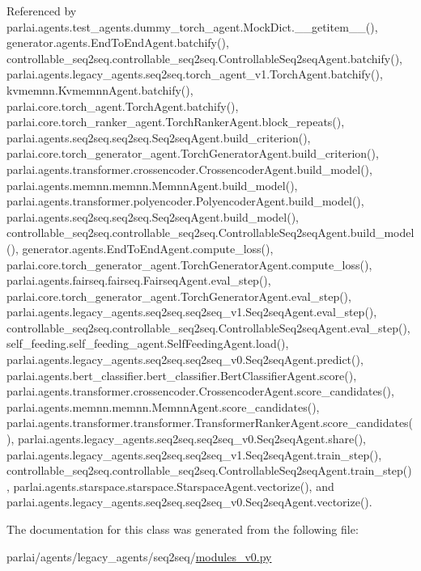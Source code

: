 Referenced by parlai.\+agents.\+test\+\_\+agents.\+dummy\+\_\+torch\+\_\+agent.\+Mock\+Dict.\+\_\+\+\_\+getitem\+\_\+\+\_\+(), generator.\+agents.\+End\+To\+End\+Agent.\+batchify(), controllable\+\_\+seq2seq.\+controllable\+\_\+seq2seq.\+Controllable\+Seq2seq\+Agent.\+batchify(), parlai.\+agents.\+legacy\+\_\+agents.\+seq2seq.\+torch\+\_\+agent\+\_\+v1.\+Torch\+Agent.\+batchify(), kvmemnn.\+Kvmemnn\+Agent.\+batchify(), parlai.\+core.\+torch\+\_\+agent.\+Torch\+Agent.\+batchify(), parlai.\+core.\+torch\+\_\+ranker\+\_\+agent.\+Torch\+Ranker\+Agent.\+block\+\_\+repeats(), parlai.\+agents.\+seq2seq.\+seq2seq.\+Seq2seq\+Agent.\+build\+\_\+criterion(), parlai.\+core.\+torch\+\_\+generator\+\_\+agent.\+Torch\+Generator\+Agent.\+build\+\_\+criterion(), parlai.\+agents.\+transformer.\+crossencoder.\+Crossencoder\+Agent.\+build\+\_\+model(), parlai.\+agents.\+memnn.\+memnn.\+Memnn\+Agent.\+build\+\_\+model(), parlai.\+agents.\+transformer.\+polyencoder.\+Polyencoder\+Agent.\+build\+\_\+model(), parlai.\+agents.\+seq2seq.\+seq2seq.\+Seq2seq\+Agent.\+build\+\_\+model(), controllable\+\_\+seq2seq.\+controllable\+\_\+seq2seq.\+Controllable\+Seq2seq\+Agent.\+build\+\_\+model(), generator.\+agents.\+End\+To\+End\+Agent.\+compute\+\_\+loss(), parlai.\+core.\+torch\+\_\+generator\+\_\+agent.\+Torch\+Generator\+Agent.\+compute\+\_\+loss(), parlai.\+agents.\+fairseq.\+fairseq.\+Fairseq\+Agent.\+eval\+\_\+step(), parlai.\+core.\+torch\+\_\+generator\+\_\+agent.\+Torch\+Generator\+Agent.\+eval\+\_\+step(), parlai.\+agents.\+legacy\+\_\+agents.\+seq2seq.\+seq2seq\+\_\+v1.\+Seq2seq\+Agent.\+eval\+\_\+step(), controllable\+\_\+seq2seq.\+controllable\+\_\+seq2seq.\+Controllable\+Seq2seq\+Agent.\+eval\+\_\+step(), self\+\_\+feeding.\+self\+\_\+feeding\+\_\+agent.\+Self\+Feeding\+Agent.\+load(), parlai.\+agents.\+legacy\+\_\+agents.\+seq2seq.\+seq2seq\+\_\+v0.\+Seq2seq\+Agent.\+predict(), parlai.\+agents.\+bert\+\_\+classifier.\+bert\+\_\+classifier.\+Bert\+Classifier\+Agent.\+score(), parlai.\+agents.\+transformer.\+crossencoder.\+Crossencoder\+Agent.\+score\+\_\+candidates(), parlai.\+agents.\+memnn.\+memnn.\+Memnn\+Agent.\+score\+\_\+candidates(), parlai.\+agents.\+transformer.\+transformer.\+Transformer\+Ranker\+Agent.\+score\+\_\+candidates(), parlai.\+agents.\+legacy\+\_\+agents.\+seq2seq.\+seq2seq\+\_\+v0.\+Seq2seq\+Agent.\+share(), parlai.\+agents.\+legacy\+\_\+agents.\+seq2seq.\+seq2seq\+\_\+v1.\+Seq2seq\+Agent.\+train\+\_\+step(), controllable\+\_\+seq2seq.\+controllable\+\_\+seq2seq.\+Controllable\+Seq2seq\+Agent.\+train\+\_\+step(), parlai.\+agents.\+starspace.\+starspace.\+Starspace\+Agent.\+vectorize(), and parlai.\+agents.\+legacy\+\_\+agents.\+seq2seq.\+seq2seq\+\_\+v0.\+Seq2seq\+Agent.\+vectorize().



The documentation for this class was generated from the following file\+:\begin{DoxyCompactItemize}
\item 
parlai/agents/legacy\+\_\+agents/seq2seq/\hyperlink{seq2seq_2modules__v0_8py}{modules\+\_\+v0.\+py}\end{DoxyCompactItemize}
